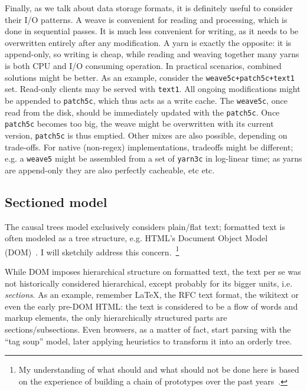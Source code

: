 \documentclass{sig-alternate}
\begin{document}
Finally, as we talk about data storage formats, it is definitely useful to consider their I/O patterns.
A weave is convenient for reading and processing, which is done in sequential passes.
It is much less convenient for writing, as it needs to be overwritten entirely after any modification.
A yarn is exactly the opposite: it is append-only, so writing is cheap, while reading and weaving together many yarns is both CPU and I/O consuming operation.
In practical scenarios, combined solutions might be better.
As an example, consider the {\tt weave5c+patch5c+text1} set.
Read-only clients may be served with {\tt text1}.
All ongoing modifications might be appended to {\tt patch5c}, which thus acts as a write cache.
The {\tt weave5c}, once read from the disk, should be immediately  updated with the {\tt patch5c}.
Once {\tt patch5c} becomes too big, the weave might be overwritten with its current version, {\tt patch5c} is thus emptied.
Other mixes are also possible, depending on trade-offs.
For native (non-regex) implementations, tradeoffs might be different; e.g. a {\tt weave5} might be assembled from a set of {\tt yarn3c} in log-linear time; as yarns are append-only they are also perfectly cacheable, etc etc.

\subsection{Sectioned model}	\label{sec:sec}

The causal trees model exclusively considers plain/flat text; formatted text is often modeled as a tree structure, e.g. HTML's Document Object Model (DOM)~\cite{dom}.
I will sketchily address this concern.~\footnote{My understanding of what should and what should not be done here is based on the experience of building a chain of prototypes over the past years~\cite{www06,csr07,wikisym08}.} 

While DOM imposes hierarchical structure on formatted text, the text per se was not historically considered hierarchical, except probably for its bigger units, i.e. \emph{sections}. 
As an example, remember LaTeX, the RFC text format, the wikitext or even the early pre-DOM HTML: the text is considered to be a flow of words and markup elements, the only hierarchically structured parts are sections/subsections.
Even browsers, as a matter of fact, start parsing with the ``tag soup'' model, later applying heuristics to transform it into an orderly tree. 
\end{document}
